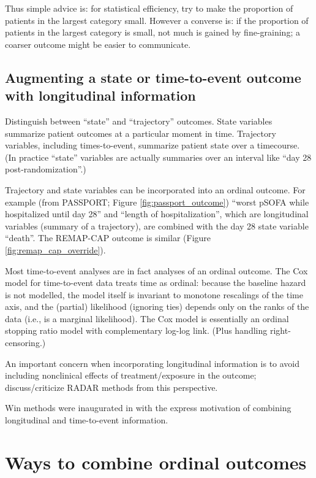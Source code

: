 \documentclass[
  11pt,
  fleqn
]{article}
\begin{document}
Thus simple advice is: for statistical efficiency, try to make
the proportion
of patients in the largest category small. However a converse is: if the
proportion of patients in the largest category is small, not much
is gained by
fine-graining; a coarser outcome might be easier to communicate.

\subsection{Augmenting a state or time-to-event outcome with
longitudinal information}

Distinguish between ``state'' and ``trajectory'' outcomes. State
variables summarize patient outcomes at a particular moment in time.
Trajectory variables, including times-to-event, summarize patient
state over a timecourse. (In practice ``state'' variables are
actually summaries over an interval like ``day 28 post-randomization''.)

Trajectory and state variables can be incorporated into an
ordinal outcome. For
example (from PASSPORT; Figure \ref{fig:passport_outcome})
``worst pSOFA while
hospitalized until day 28'' and ``length of hospitalization'', which are
longitudinal variables (summary of a trajectory), are combined
with the day 28
state variable ``death''. The REMAP-CAP outcome is similar (Figure
\ref{fig:remap_cap_override}).

Most time-to-event analyses are in fact analyses of an ordinal
outcome. The Cox
model for time-to-event data treats time as ordinal: because the baseline
hazard is not modelled, the model itself is invariant to monotone
rescalings of
the time axis, and the (partial) likelihood (ignoring ties)
depends only on the
ranks of the data (i.e., is a marginal likelihood). The Cox model is
essentially an ordinal stopping ratio model with complementary log-log link.
(Plus handling right-censoring.)

An important concern when incorporating longitudinal information is
to avoid including nonclinical effects of treatment/exposure in the
outcome; \citet{ongUnlockingDOORHow2023} discuss/criticize RADAR
methods from this perspective.

Win methods were inaugurated in
\citet{finkelsteinCombiningMortalityLongitudinal1999} with the
express motivation of combining longitudinal and time-to-event information.

\section{Ways to combine ordinal outcomes}
\end{document}
